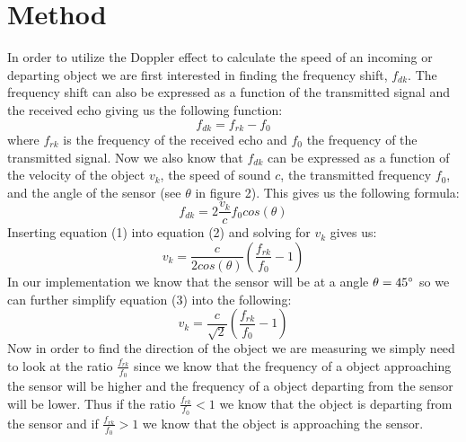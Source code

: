 \documentclass[a4paper,11pt]{article}
\begin{document}
\section{Method}
In order to utilize the Doppler effect to calculate the speed of an incoming or departing object we are first interested in finding the frequency shift, $f_{dk}$. The frequency shift can also be expressed as a function of the transmitted signal and the received echo giving us the following function:\\ 
\begin{equation}
f_{dk} = f_{rk} - f_0
\end{equation}
where $f_{rk}$ is the frequency of the received echo and $f_0$ the frequency of the transmitted signal. Now we also know that $f_{dk}$ can be expressed as a function of the velocity of the object $v_k$, the speed of sound $c$, the transmitted frequency $f_0$, and the angle of the sensor (see $\theta$ in figure 2). This gives us the following formula: 
\begin{equation}
f_{dk} = 2\frac{v_k}{c}f_0cos(\theta)
\end{equation}
Inserting equation (1) into equation (2) and solving for $v_k$ gives us:
\begin{equation}
v_k = \frac{c}{2cos(\theta)}(\frac{f_{rk}}{f_0}-1)
\end{equation}
In our implementation we know that the sensor will be at a angle $\theta = 45\degree$ so we can further simplify equation (3) into the following:
\begin{equation}
v_k = \frac{c}{\sqrt{2}}(\frac{f_{rk}}{f_0}-1)
\end{equation}
Now in order to find the direction of the object we are measuring we simply need to look at the ratio $\frac{f_{rk}}{f_0}$ since we know that the frequency of a object approaching the sensor will be higher and the frequency of a object departing from the sensor will be lower. Thus if the ratio $\frac{f_{rk}}{f_0} < 1$ we know that the object is departing from the sensor and if $\frac{f_{rk}}{f_0} > 1$ we know that the object is approaching the sensor.
\end{document}
